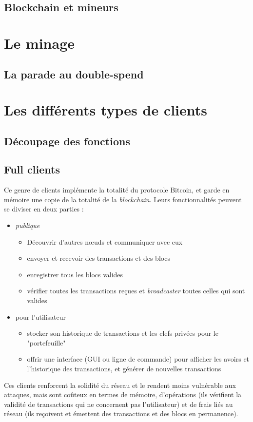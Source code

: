 \documentclass[11pt,a4paper]{article}
\begin{document}
\subsection{Blockchain et mineurs}

\section{Le minage}
\subsection{La parade au double-spend}

\section{Les différents types de clients}
\subsection{Découpage des fonctions}
\subsection{Full clients}
Ce genre de clients implémente la totalité du protocole Bitcoin, et garde en mémoire une copie de la totalité de la \textit{blockchain}. Leurs fonctionnalités peuvent se diviser en deux parties :
\begin{itemize}
	\item \textit{publique}\begin{itemize}
		\item Découvrir d'autres n\oe{}uds et communiquer avec eux
		\item envoyer et recevoir des transactions et des blocs
		\item enregistrer tous les blocs valides
		\item vérifier toutes les transactions reçues et \textit{broadcaster} toutes celles qui sont valides
	\end{itemize}
	\item pour l'utilisateur \begin{itemize}
		\item stocker son historique de transactions et les clefs privées pour le "portefeuille"
		\item offrir une interface (GUI ou ligne de commande) pour afficher les avoirs et l'historique des transactions, et générer de nouvelles transactions
	\end{itemize}
\end{itemize}
Ces clients renforcent la solidité du réseau et le rendent moins vulnérable aux attaques, mais sont coûteux en termes de mémoire, d'opérations (ils vérifient la validité de transactions qui ne concernent pas l'utilisateur) et de frais liés au réseau (ils reçoivent et émettent des transactions et des blocs en permanence).
\end{document}
